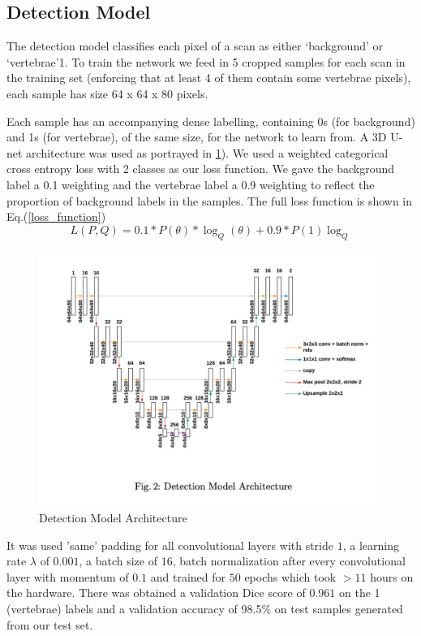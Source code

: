 \subsection{Detection Model}
The detection model classifies each pixel of a scan as either ‘background’ or ‘vertebrae’1. To train the network we feed in 5 cropped samples for each scan in the training set (enforcing that at least 4 of them contain some vertebrae pixels), each sample has size 64 x 64 x 80 pixels. 

Each sample has an accompanying dense labelling, containing 0s (for background) and 1s (for vertebrae), of the same size, for the network to learn from. A 3D U-net architecture was used as portrayed in \ref{fig:detection_model_architecture}). We used a weighted categorical cross entropy loss with 2 classes as our loss function. We gave the background label a 0.1 weighting and the vertebrae label a 0.9 weighting to reflect the proportion of background labels in the samples. 
The full loss function is shown in Eq.(\ref{loss_function}) 
\begin{equation}\label{loss_function}
L(P,Q) = 0.1 * P(\theta) * \log_Q(\theta) + 0.9 * P(1)\log_Q
\end{equation}

\begin{figure}[!h]
\begin{center}
\includegraphics[width=.5\linewidth]{images/detection_model_architecture.png}
\caption {Detection Model Architecture} 
\label{fig:detection_model_architecture}
\end{center}
\end{figure}

It was used ’same’ padding for all convolutional layers with stride $1$, a learning rate $\lambda$ of $0.001$, a batch size of $16$, batch normalization after every convolutional layer with momentum of $0.1$ and trained for $50$ epochs which took $> 11$ hours on the hardware. There was obtained a validation Dice score of $0.961$ on the 1 (vertebrae) labels and a validation accuracy of 98.5\% on test samples generated from our test set.


